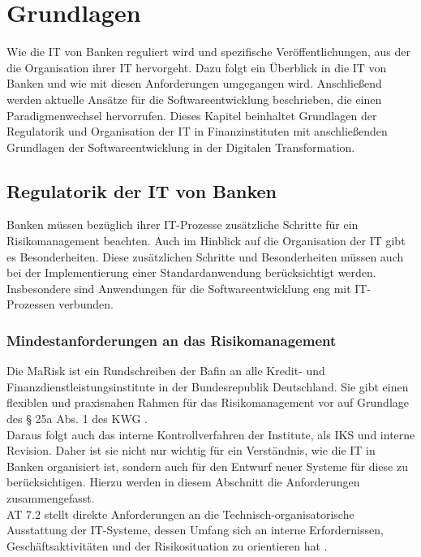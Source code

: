 \chapter{Grundlagen}
\label{ch:background}
Wie die IT von Banken reguliert wird und spezifische Veröffentlichungen, aus der die Organisation ihrer IT hervorgeht. Dazu folgt ein Überblick in die IT von Banken und wie mit diesen Anforderungen umgegangen wird. Anschließend werden aktuelle Ansätze für die Softwareentwicklung beschrieben, die einen Paradigmenwechsel hervorrufen. Dieses Kapitel beinhaltet Grundlagen der Regulatorik und Organisation der IT in Finanzinstituten mit anschließenden Grundlagen der Softwareentwicklung in der Digitalen Transformation.

%
%

\section{Regulatorik der IT von Banken}

Banken müssen bezüglich ihrer IT-Prozesse zusätzliche Schritte für ein Risikomanagement beachten. Auch im Hinblick auf die Organisation der IT gibt es Besonderheiten. Diese zusätzlichen Schritte und Besonderheiten müssen auch bei der Implementierung einer Standardanwendung berücksichtigt werden. Insbesondere sind Anwendungen für die Softwareentwicklung eng mit IT-Prozessen verbunden.

\subsection{Mindestanforderungen an das Risikomanagement}
Die \ac{MaRisk} ist ein Rundschreiben der Bafin an alle Kredit- und Finanzdienstleistungsinstitute in der Bundesrepublik Deutschland. Sie gibt einen flexiblen und praxisnahen Rahmen für das Risikomanagement vor auf Grundlage des § 25a Abs. 1 des \ac{KWG} \cite{MaRisk:2017}. 
\\
Daraus folgt auch das interne Kontrollverfahren der Institute, als \ac{IKS} und interne Revision. Daher ist sie nicht nur wichtig für ein Verständnis, wie die IT in Banken organisiert ist, sondern auch für den Entwurf neuer Systeme für diese zu berücksichtigen. Hierzu werden in diesem Abschnitt die Anforderungen zusammengefasst.
\\
AT 7.2 stellt direkte Anforderungen an die Technisch-organisatorische Ausstattung der IT-Systeme, dessen Umfang sich an interne Erfordernissen, Geschäftsaktivitäten und der Risikosituation zu orientieren hat \cite{MaRisk:2017}.

